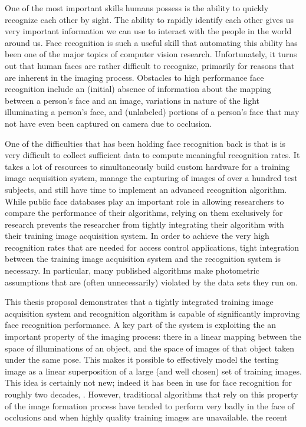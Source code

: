 
One of the most important skills humans possess is the ability to quickly
recognize each other by sight.   The ability to rapidly identify each other
gives us very important information we can use to interact with the people in
the world around us.  Face recognition is such a useful skill that automating
this ability has been one of the major topics of computer vision research.
Unfortunately, it turns out that human faces are rather difficult to recognize,
primarily for reasons that are inherent in the imaging process.  Obstacles to
high performance face recognition include an (initial) absence of information
about the mapping between a person's face and an image, variations in nature of
the light illuminating a person's face, and (unlabeled) portions of a person's
face that may not have even been captured on camera due to occlusion.  

One of the difficulties that has been holding face recognition back is that is
is very difficult to collect sufficient data to compute meaningful recognition
rates.  It takes a lot of resources to simultaneously build custom hardware for
a training image acquisition system, manage the capturing of images of over a
hundred test subjects, and still have time to implement an advanced recognition
algorithm.  While public face databases play an important role in allowing
researchers to compare the performance of their algorithms, relying on them
exclusively for research prevents the researcher from tightly integrating their
algorithm with their training image acquisition system.  In order to achieve
the very high recognition rates that are needed for access control
applications, tight integration between the training image acquisition system
and the recognition system is necessary.  In particular, many published
algorithms make photometric assumptions that are (often unnecessarily) violated
by the data sets they run on.

This thesis proposal demonstrates that a tightly integrated training image
acquisition system and recognition algorithm is capable of significantly
improving face recognition performance.  A key part of the system is exploiting
the an important property of the imaging process:  there in a linear mapping
between the space of illuminations of an object, and the space of images of
that object taken under the same pose.  This makes it possible to effectively
model the testing image as a linear superposition of a large (and well chosen)
set of training images.  This idea is certainly not new; indeed it has been in
use for face recognition for roughly two decades, \cite{Turk1991-CVPR}.
However, traditional algorithms that rely on this property of the image
formation process have tended to perform very badly in the face of occlusions
and when highly quality training images are unavailable.  the recent 

